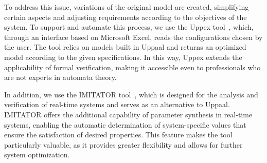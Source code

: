 To address this issue, variations of the original model are created, simplifying certain aspects and adjusting requirements according to the objectives of the system. To support and automate this process, we use the Uppex tool~\cite{uppex,uppex-railway}, which, through an interface based on Microsoft Excel, reads the configurations chosen by the user. The tool relies on models built in Uppaal and returns an optimized model according to the given specifications. In this way, Uppex extends the applicability of formal verification, making it accessible even to professionals who are not experts in automata theory.

In addition, we use the IMITATOR tool~\cite{citacao3}, which is designed for the analysis and verification of real-time systems and serves as an alternative to Uppaal. IMITATOR offers the additional capability of parameter synthesis in real-time systems, enabling the automatic determination of system-specific values that ensure the satisfaction of desired properties. This feature makes the tool particularly valuable, as it provides greater flexibility and allows for further system optimization.




